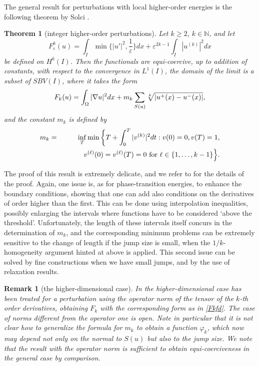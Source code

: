 \documentclass{article}
\newtheorem{remark}[lemma]{Remark}
\newtheorem{theorem}[lemma]{Theorem}
\newcommand{\e}{\varepsilon}
\begin{document}
\smallskip
The general result for perturbations with local higher-order energies is the following theorem by Solci \cite{MR4937467}.

\begin{theorem}[integer higher-order perturbations]
Let $k\ge 2$, $k\in\mathbb N$, and let 
\begin{equation}\label{Fkfd}
F^k_\e(u)=\int_I \min\Big\{|u'|^2,\frac1\e\Big\}dx+\e^{2k-1} \int_I|u^{(k)}|^2dx 
\end{equation}
be defined on $H^k(I)$. Then the functionals are equi-coercive, up to addition of constants, with respect to the convergence in $L^1(I)$, the domain of the limit is a subset of $SBV(I)$, where it takes the form 
$$
F_k(u)=\int_\Omega|\nabla u|^2dx+ m_k\sum_{S(u)} \root k \of{|u^+(x)-u^-(x)|},
$$
and the constant $m_k$ is defined by 
\begin{eqnarray}\label{cpj}\nonumber
m_k&=&\inf_T\min\bigg\{ T+\int_0^T|v^{(k)}|^2dt: v(0)=0, v(T)=1,\\
&& \hskip 1cm v^{(\ell)}(0)=v^{(\ell)}(T)=0 \hbox{ for } \ell\in\{1,\ldots, k-1\}\Big\}.
\end{eqnarray}
\end{theorem}

The proof of this result is extremely delicate, and we refer to \cite{Solci} for the details of the proof. Again, one issue is, as for phase-transition energies, to enhance the boundary conditions, showing that one can add also conditions on the derivatives of order higher than the first. This can be done using interpolation inequalities, possibly enlarging the intervals where functions have to be considered `above the threshold'. Unfortunately, the length of these intervals itself concurs in the determination of $m_k$, and the corresponding minimum problems can be extremely sensitive to the change of length if the jump size is small, when the $1/k$-homogeneity argument hinted at above is applied. This second issue can be solved by fine constructions when we have small jumps, and by the use of relaxation results. 

\begin{remark}[the higher-dimensional case]\rm
In \cite{MR4937467} the higher-dimensional case has been treated for a perturbation using the operator norm of the tensor of the $k$-th order derivatives, obtaining  $F_k$ with the corresponding form as in  \eqref{Fkfd}. The case of norms different from the operator one is open. Note in particular that it is not clear how to generalize the formula for $m_k$ to obtain a function $\varphi_k$, which now may depend not only on the normal to $S(u)$ but also to the jump size. We note that the result with the operator norm is sufficient to obtain equi-coerciveness in the general case by comparison.
\end{remark}
\end{document}
